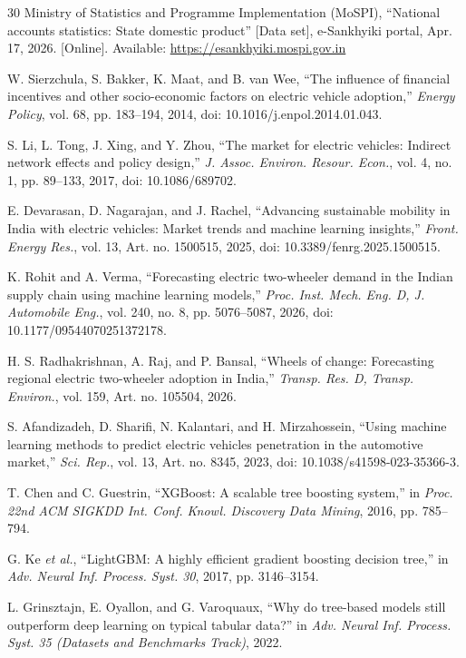 \begin{thebibliography}{30}
 Ministry of Statistics and Programme Implementation (MoSPI), ``National accounts statistics: State domestic product'' [Data set], e-Sankhyiki portal, Apr. 17, 2026. [Online]. Available: \url{https://esankhyiki.mospi.gov.in}

 W. Sierzchula, S. Bakker, K. Maat, and B. van Wee, ``The influence of financial incentives and other socio-economic factors on electric vehicle adoption,'' \emph{Energy Policy}, vol. 68, pp. 183--194, 2014, doi: 10.1016/j.enpol.2014.01.043.

 S. Li, L. Tong, J. Xing, and Y. Zhou, ``The market for electric vehicles: Indirect network effects and policy design,'' \emph{J. Assoc. Environ. Resour. Econ.}, vol. 4, no. 1, pp. 89--133, 2017, doi: 10.1086/689702.

 E. Devarasan, D. Nagarajan, and J. Rachel, ``Advancing sustainable mobility in India with electric vehicles: Market trends and machine learning insights,'' \emph{Front. Energy Res.}, vol. 13, Art. no. 1500515, 2025, doi: 10.3389/fenrg.2025.1500515.

 K. Rohit and A. Verma, ``Forecasting electric two-wheeler demand in the Indian supply chain using machine learning models,'' \emph{Proc. Inst. Mech. Eng. D, J. Automobile Eng.}, vol. 240, no. 8, pp. 5076--5087, 2026, doi: 10.1177/09544070251372178.

 H. S. Radhakrishnan, A. Raj, and P. Bansal, ``Wheels of change: Forecasting regional electric two-wheeler adoption in India,'' \emph{Transp. Res. D, Transp. Environ.}, vol. 159, Art. no. 105504, 2026.

 S. Afandizadeh, D. Sharifi, N. Kalantari, and H. Mirzahossein, ``Using machine learning methods to predict electric vehicles penetration in the automotive market,'' \emph{Sci. Rep.}, vol. 13, Art. no. 8345, 2023, doi: 10.1038/s41598-023-35366-3.

 T. Chen and C. Guestrin, ``XGBoost: A scalable tree boosting system,'' in \emph{Proc. 22nd ACM SIGKDD Int. Conf. Knowl. Discovery Data Mining}, 2016, pp. 785--794.

 G. Ke \emph{et al.}, ``LightGBM: A highly efficient gradient boosting decision tree,'' in \emph{Adv. Neural Inf. Process. Syst. 30}, 2017, pp. 3146--3154.

 L. Grinsztajn, E. Oyallon, and G. Varoquaux, ``Why do tree-based models still outperform deep learning on typical tabular data?'' in \emph{Adv. Neural Inf. Process. Syst. 35 (Datasets and Benchmarks Track)}, 2022.


\end{thebibliography}
